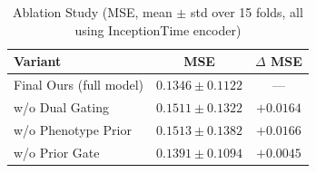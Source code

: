 \documentclass{article}
\begin{document}
\begin{table}[htbp]
\centering
\caption{Ablation Study (MSE, mean $\pm$ std over 15 folds, all using InceptionTime encoder)}
\label{tab:ablation}
\begin{tabular}{lcc}
\toprule
\textbf{Variant} & \textbf{MSE} & \textbf{$\Delta$ MSE} \\
\midrule
Final Ours (full model) & $0.1346 \pm 0.1122$ & --- \\
w/o Dual Gating & $0.1511 \pm 0.1322$ & $+0.0164$ \\
w/o  Phenotype Prior & $0.1513 \pm 0.1382$ & $+0.0166$ \\
w/o  Prior Gate & $0.1391 \pm 0.1094$ & $+0.0045$ \\
\bottomrule
\end{tabular}
\end{table}
\end{document}
